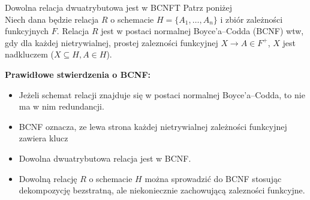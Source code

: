 
{Dowolna relacja dwuatrybutowa jest w BCNF}{T}
{Patrz poniżej}{\\}
\noindent Niech dana będzie relacja $R$ o schemacie $H = \{A_1,\ldots, A_n\}$ i zbiór zależności funkcyjnych $F$.
Relacja $R$ jest w postaci normalnej Boyce’a–Codda (BCNF) wtw, gdy dla każdej nietrywialnej, prostej zalezności funkcyjnej $X \rightarrow A \in F^+ $, $X$ jest nadkluczem ($X \subseteq H, A \in H$).
\vspace{0.2cm}

\noindent \textbf{Prawidłowe stwierdzenia o BCNF:}
\begin{itemize}
  \item Jeżeli schemat relacji znajduje się w postaci normalnej Boyce’a–Codda, to nie ma w nim redundancji.
  \item BCNF oznacza, ze lewa strona każdej nietrywialnej zależności funkcyjnej zawiera klucz
  \item Dowolna dwuatrybutowa relacja jest w BCNF.
  \item Dowolną relację $R$ o schemacie $H$ można sprowadzić do BCNF stosując dekompozycję bezstratną, ale niekoniecznie zachowującą zalezności funkcyjne.
\end{itemize}

